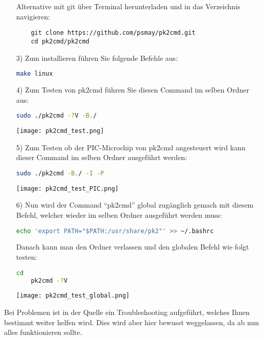 \begin{itemize}
    Alternative mit git über Terminal herunterladen und in das Verzeichnis navigieren:
    \begin{lstlisting}
    git clone https://github.com/psmay/pk2cmd.git
    cd pk2cmd/pk2cmd
    \end{lstlisting}
    \item[3)] Zum installieren führen Sie folgende Befehle aus:
    \begin{lstlisting}[language=bash]
    make linux
    \end{lstlisting}
    \item[4)] Zum Testen von pk2cmd führen Sie diesen Command im selben Ordner aus:
    \begin{lstlisting}[language=bash]
    sudo ./pk2cmd -?V -B./
    \end{lstlisting}
    \begin{center}
        \texttt{[image: pk2cmd\_test.png]}
    \end{center}
    \newpage
    \item[5)] Zum Testen ob der PIC-Microchip von pk2cmd angesteuert wird kann dieser Command im selben Ordner ausgeführt werden:
    \begin{lstlisting}[language=bash]
    sudo ./pk2cmd -B./ -I -P
    \end{lstlisting}
    \begin{center}
        \texttt{[image: pk2cmd\_test\_PIC.png]}
    \end{center}
    \item[6)] Nun wird der Command \enquote{pk2cmd} global zugänglich gemach mit diesem Befehl, welcher wieder im selben Ordner ausgeführt werden muss:
    \begin{lstlisting}[language=bash]
    echo 'export PATH="$PATH:/usr/share/pk2"' >> ~/.bashrc
    \end{lstlisting}
    Danach kann man den Ordner verlassen und den globalen Befehl wie folgt testen:
    \begin{lstlisting}[language=bash]
    cd
    pk2cmd -?V
    \end{lstlisting}
    \begin{center}
       \texttt{[image: pk2cmd\_test\_global.png]}
    \end{center}
\end{itemize}
Bei Problemen ist in der Quelle ein Troubleshooting aufgeführt, welches Ihnen bestimmt weiter helfen wird. Dies wird aber hier bewusst weggelassen, da ab nun alles funktionieren sollte.
\newpage
